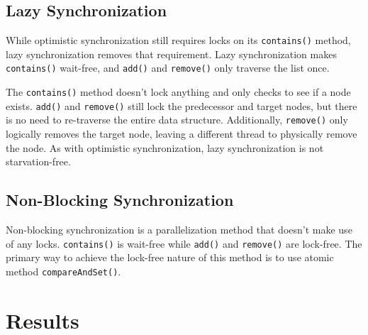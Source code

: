 \documentclass[conference]{IEEEtran}
\begin{document}

\subsection{Lazy Synchronization}
While optimistic synchronization still requires locks on its \verb|contains()| method, lazy synchronization removes that requirement. Lazy synchronization makes \verb|contains()| wait-free, and \verb|add()| and \verb|remove()| only traverse the list once. \cite{textbook} 

The \verb|contains()| method doesn't lock anything and only checks to see if a node exists. \verb|add()| and \verb|remove()| still lock the predecessor and target nodes, but there is no need to re-traverse the entire data structure. Additionally, \verb|remove()| only logically removes the target node, leaving a different thread to physically remove the node. As with optimistic synchronization, lazy synchronization is not starvation-free.



\subsection{Non-Blocking Synchronization}
Non-blocking synchronization is a parallelization method that doesn't make use of any locks. \verb|contains()| is wait-free while \verb|add()| and \verb|remove()| are lock-free. \cite{textbook} The primary way to achieve the lock-free nature of this method is to use atomic method \verb|compareAndSet()|.



\section{Results}

\end{document}
